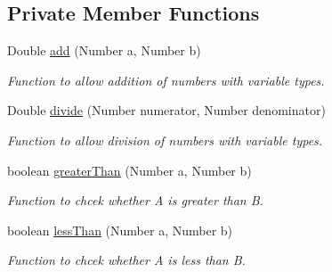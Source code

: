 \subsection*{Private Member Functions}
\begin{DoxyCompactItemize}
\item 
Double \hyperlink{class_android_app_1_1_data_item_aef809535c5a50c48d521db5ee9f6f9a7}{add} (Number a, Number b)
\begin{DoxyCompactList}\small\item\em Function to allow addition of numbers with variable types. \end{DoxyCompactList}\item 
Double \hyperlink{class_android_app_1_1_data_item_a3c4b68091e69bed9af18df05d6ea26a5}{divide} (Number numerator, Number denominator)
\begin{DoxyCompactList}\small\item\em Function to allow division of numbers with variable types. \end{DoxyCompactList}\item 
boolean \hyperlink{class_android_app_1_1_data_item_ab7fc2c1c68ba314ce4131e3e761aef2e}{greater\+Than} (Number a, Number b)
\begin{DoxyCompactList}\small\item\em Function to chcek whether A is greater than B. \end{DoxyCompactList}\item 
boolean \hyperlink{class_android_app_1_1_data_item_a94d948e8d1922c116246402c633109fc}{less\+Than} (Number a, Number b)
\begin{DoxyCompactList}\small\item\em Function to chcek whether A is less than B. \end{DoxyCompactList}\end{DoxyCompactItemize}
